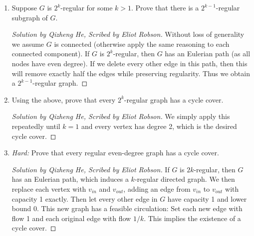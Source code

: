 \documentclass{article}
\newenvironment{scribed}[2]{\begin{proof}[Solution by #1, Scribed by #2]}{\end{proof}}
\begin{document}
\begin{enumerate}
    \item Suppose \(G\) is \(2^k\)-regular for some \(k > 1\). Prove that there is a \(2^{k-1}\)-regular subgraph of \(G\).
    
    \begin{scribed}{Qizheng He}{Eliot Robson}
        Without loss of generality we assume \(G\) is connected (otherwise apply the same reasoning to each connected component). If \(G\) is \(2^k\)-regular, then \(G\) has an Eulerian path (as all nodes have even degree). If we delete every other edge in this path, then this will remove exactly half the edges while preserving regularity. Thus we obtain a \(2^{k-1}\)-regular graph.
    \end{scribed}
    
    \item Using the above, prove that every \(2^k\)-regular graph has a cycle cover.
    
    \begin{scribed}{Qizheng He}{Eliot Robson}
        We simply apply this repeatedly until \(k = 1\) and every vertex has degree 2, which is the desired cycle cover.
    \end{scribed}
    
    \item \emph{Hard:} Prove that every regular even-degree graph has a cycle cover.
    
    \begin{scribed}{Qizheng He}{Eliot Robson}
        If \(G\) is \(2k\)-regular, then \(G\) has an Eulerian path, which induces a \(k\)-regular directed graph. We then replace each vertex with \(v_{in}\) and \(v_{out}\), adding an edge from \(v_{in}\) to \(v_{out}\) with capacity 1 exactly. Then let every other edge in \(G\) have capacity 1 and lower bound 0. This new graph has a feasible circulation: Set each new edge with flow 1 and each original edge with flow \(1/k\). This implies the existence of a cycle cover.
    \end{scribed}
\end{enumerate}
\end{document}

